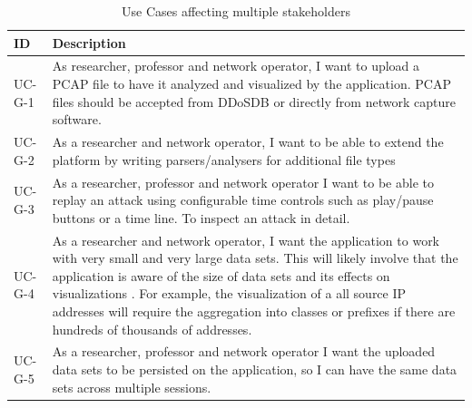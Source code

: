 \begin{table}[]
\centering
\begin{tabular}{|p{1.6cm}|p{12cm}|}
\hline
\textbf{ID} & \textbf{Description} \\ \hline

UC-G-1         & As researcher, professor and network operator, I want to upload a PCAP file to have it analyzed and  visualized by the application. PCAP files should be accepted from DDoSDB or directly from network capture software.\\ \hline
UC-G-2         & As a researcher and network operator, I want to be able to extend the platform by writing parsers/analysers for additional file types\\ \hline
UC-G-3         & As a researcher, professor and network operator I want to be able to replay an attack using configurable time controls such as play/pause buttons or a time line. To inspect an attack in detail.\\ \hline
UC-G-4       & As a researcher and network operator, I want the application to work with very small and very large data sets. This will likely involve that the application is aware of the size of data sets and its effects on visualizations \cite{appliedsecurityvisualization}. For example, the visualization of a all source IP addresses will require the aggregation into classes or prefixes if there are hundreds of thousands of addresses.\\ \hline
UC-G-5         & As a researcher, professor and network operator I want the uploaded data sets to be persisted on the application, so I can have the same data sets across multiple sessions.\\ \hline

\end{tabular}
\caption{Use Cases affecting multiple stakeholders}
\label{table:us-general}
\end{table} 

